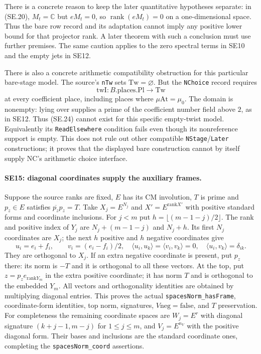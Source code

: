 There is a concrete reason to keep the later quantitative hypotheses
separate: in (SE.20), $M_t=\mathbb C$ but $eM_t=0$, so
$\operatorname{rank}(eM_t)=0$ on a one-dimensional space. Thus the
bare row record and its adaptation cannot imply any positive lower
bound for that projector rank. A later theorem with such a conclusion
must use further premises. The same caution applies to the zero
spectral terms in SE10 and the empty jets in SE12.

There is also a concrete arithmetic compatibility obstruction for this
particular bare-stage model. The source's \texttt{nTw} sets
$\mathrm{Tw}=\varnothing$. But the \texttt{NChoice} record requires
\[
       \mathrm{twI}:B.\mathrm{places}.\mathrm{Pl}\longrightarrow
                         \mathrm{Tw}
 \tag{SE.24}
\]
at every coefficient place, including places where $\mu\mathrm{At}=\mu_0$.
The domain is nonempty: lying over supplies a prime of the coefficient
number field above $2$, as in SE12. Thus (SE.24) cannot exist for this
specific empty-twist model. Equivalently its \texttt{ReadElsewhere}
condition fails even though its nonreference support is empty. This
does not rule out other compatible \texttt{NStage}/\texttt{Later}
constructions; it proves that the displayed bare construction cannot
by itself supply NC's arithmetic choice interface.

\paragraph{SE15: diagonal coordinates supply the auxiliary frames.}
Suppose the source ranks are fixed, $E$ has its CM involution, $T$ is
prime and $p_z\in E$ satisfies $\overline{p_z}p_z=T$. Take
$X_j=E^{N_j}$ and $X'=E^{\mathrm{rank}X'}$ with positive standard
forms and coordinate inclusions. For $j<m$ put
$h=\lfloor(m-1-j)/2\rfloor$. The rank and positive index of $Y_j$
are $N_j+(m-1-j)$ and $N_j+h$. Its first $N_j$ coordinates are
$X_j$; the next $h$ positive and $h$ negative coordinates give
\[
 u_i=e_i+f_i,\qquad v_i=(e_i-f_i)/2,
 \quad\langle u_i,u_k\rangle=\langle v_i,v_k\rangle=0,
 \quad\langle u_i,v_k\rangle=\delta_{ik}.
 \tag{SE.21}
\]
They are orthogonal to $X_j$. If an extra negative coordinate is
present, put $p_z$ there: its norm is $-T$ and it is orthogonal to all
these vectors. At the top, put $z=p_z e_{\mathrm{rank}Y_m}$ in the
extra positive coordinate; it has norm $T$ and is orthogonal to the
embedded $Y_m$. All vectors and orthogonality identities are obtained
by multiplying diagonal entries. This proves the actual
\texttt{spacesNorm\_hasFrame}, coordinate-form identities, top norm,
signatures, $V\mathrm{neg}=\mathrm{false}$, and $T$ preservation.
For completeness the remaining coordinate spaces are
$W_j=E^r$ with diagonal signature $(k+j-1,m-j)$ for $1\le j\le m$,
and $V_j=E^{n_V}$ with the positive diagonal form. Their bases and
inclusions are the standard coordinate ones, completing the
\texttt{spacesNorm\_coord} assertions.

